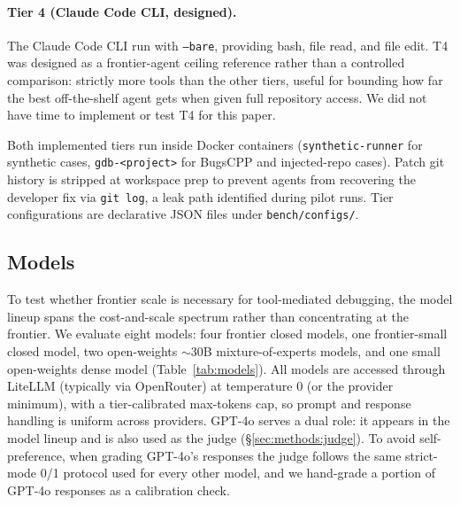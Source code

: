 \documentclass[11pt]{article}
\begin{document}
\paragraph{Tier 4 (Claude Code CLI, designed).} The Claude Code CLI run with \texttt{--bare}, providing bash, file read, and file edit. T4 was designed as a frontier-agent ceiling reference rather than a controlled comparison: strictly more tools than the other tiers, useful for bounding how far the best off-the-shelf agent gets when given full repository access. We did not have time to implement or test T4 for this paper.

Both implemented tiers run inside Docker containers (\texttt{synthetic-runner} for synthetic cases, \texttt{gdb-<project>} for BugsCPP and injected-repo cases). Patch git history is stripped at workspace prep to prevent agents from recovering the developer fix via \texttt{git log}, a leak path identified during pilot runs. Tier configurations are declarative JSON files under \texttt{bench/configs/}.

\subsection{Models}
\label{sec:methods:models}

To test whether frontier scale is necessary for tool-mediated debugging, the model lineup spans the cost-and-scale spectrum rather than concentrating at the frontier. We evaluate eight models: four frontier closed models, one frontier-small closed model, two open-weights $\sim$30B mixture-of-experts models, and one small open-weights dense model (Table~\ref{tab:models}). All models are accessed through LiteLLM (typically via OpenRouter) at temperature 0 (or the provider minimum), with a tier-calibrated max-tokens cap, so prompt and response handling is uniform across providers. GPT-4o serves a dual role: it appears in the model lineup and is also used as the judge (\S\ref{sec:methods:judge}). To avoid self-preference, when grading GPT-4o's responses the judge follows the same strict-mode 0/1 protocol used for every other model, and we hand-grade a portion of GPT-4o responses as a calibration check.
\end{document}
